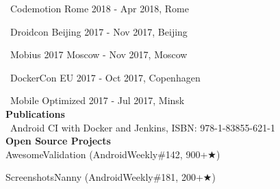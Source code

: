 \documentclass[12pt, a4paper]{article}
\begin{document}
\faMicrophone\ Codemotion Rome 2018 - Apr 2018, Rome

\faMicrophone\ Droidcon Beijing 2017 - Nov 2017, Beijing

\faMicrophone\ Mobius 2017 Moscow - Nov 2017, Moscow

\faMicrophone\ DockerCon EU 2017 - Oct 2017, Copenhagen

\faMicrophone\ Mobile Optimized 2017 - Jul 2017, Minsk
~\\

\textcolor{highlightblue}{\textbf{\huge Publications}} \\

\faBook\ Android CI with Docker and Jenkins, ISBN: 978-1-83855-621-1
~\\

\textcolor{highlightblue}{\textbf{\huge Open Source Projects}} \\

AwesomeValidation (AndroidWeekly\#142, 900+{\DejaVuSans ★})

ScreenshotsNanny (AndroidWeekly\#181, 200+{\DejaVuSans ★})
\end{document}
